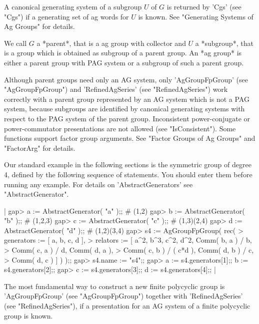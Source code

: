 A canonical  generating system of  a subgroup  $U$ of  $G$ is returned by
'Cgs' (see "Cgs") if a generating set of ag words  for $U$ is known.  See
"Generating Systems of Ag Groups" for details.

We call $G$  a *parent*, that  is  a ag group  with  collector and $U$  a
*subgroup*, that is a group  which is  obtained  as subgroup of a  parent
group.  An *ag  group* is  either  a parent group  with  PAG system or  a
subgroup of such a parent group.

Although parent groups need only an AG system, only 'AgGroupFpGroup' (see
"AgGroupFpGroup")    and 'RefinedAgSeries'   (see "RefinedAgSeries") work
correctly with a parent group represented by an AG system  which is not a
PAG system,  because  subgroups  are identified by  canonical  generating
systems with respect to the PAG system of the parent group.  Inconsistent
power-conjugate or  power-commutator  presentations are  not allowed (see
"IsConsistent").  Some functions  support  factor group arguments.    See
"Factor Groups of Ag Groups" and "FactorArg" for details.

Our standard example in the following sections  is the symmetric group of
degree  4, defined by the following  sequence of {\GAP} statements.   You
should enter  them    before  running any   example.   For    details  on
'AbstractGenerators' see "AbstractGenerator".

|    gap> a  := AbstractGenerator( "a" );;  # (1,2)
    gap> b  := AbstractGenerator( "b" );;  # (1,2,3)
    gap> c  := AbstractGenerator( "c" );;  # (1,3)(2,4)
    gap> d  := AbstractGenerator( "d" );;  # (1,2)(3,4)
    gap> s4 := AgGroupFpGroup( rec(
    >        generators := [ a, b, c, d ],
    >        relators   := [ a^2, b^3, c^2, d^2, Comm( b, a ) / b,
    >                        Comm( c, a ) / d, Comm( d, a ),
    >                        Comm( c, b ) / ( c*d ), Comm( d, b ) / c,
    >                        Comm( d, c ) ] ) );;
    gap> s4.name := "s4";;
    gap> a := s4.generators[1];; b := s4.generators[2];;
    gap> c := s4.generators[3];; d := s4.generators[4];; |


The most fundamental way  to construct a  new  finite polycyclic group is
'AgGroupFpGroup' (see  "AgGroupFpGroup")  together with 'RefinedAgSeries'
(see "RefinedAgSeries"), if a presentation for  an  AG system of a finite
polycyclic group is known.

